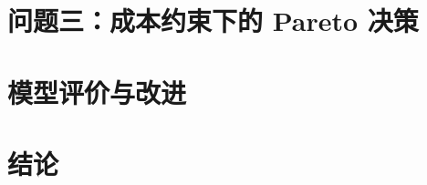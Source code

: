 \documentclass[UTF8,a4paper,11pt]{ctexart}
\begin{document}
\section{问题三：成本约束下的 Pareto 决策}


\section{模型评价与改进}


\section{结论}





\end{document}
